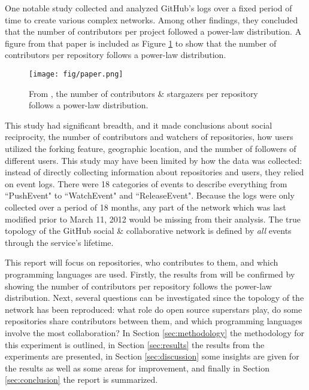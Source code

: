 \documentclass[11pt]{article}
\begin{document}
One notable study \cite{paper} collected and analyzed GitHub's logs over a fixed period of time to create various complex networks. Among other findings, they concluded that the number of contributors per project followed a power-law distribution. A figure from that paper is included as Figure \ref{fig:paper.png} to show that the number of contributors per repository follows a power-law distribution.

\begin{figure}[h]
  \centering
  \texttt{[image: fig/paper.png]}
  \caption{From \cite{paper}, the number of contributors \& stargazers per repository follows a power-law distribution.}
  \label{fig:paper.png}
\end{figure}

This study had significant breadth, and it made conclusions about social reciprocity, the number of contributors and watchers of repositories, how users utilized the forking feature, geographic location, and the number of followers of different users. This study may have been limited by how the data was collected: instead of directly collecting information about repositories and users, they relied on event logs. There were 18 categories of events to describe everything from ``PushEvent" to ``WatchEvent" and ``ReleaseEvent". Because the logs were only collected over a period of 18 months, any part of the network which was last modified prior to March 11, 2012 would be missing from their analysis. The true topology of the GitHub social \& collaborative network is defined by \emph{all} events through the service's lifetime.

This report will focus on repositories, who contributes to them, and which programming languages are used. Firstly, the results from \cite{paper} will be confirmed by showing the number of contributors per repository follows the power-law distribution. Next, several questions can be investigated since the topology of the network has been reproduced: what role do open source superstars play, do some repositories share contributors between them, and which programming languages involve the most collaboration? In Section \ref{sec:methodology} the methodology for this experiment is outlined, in Section \ref{sec:results} the results from the experiments are presented, in Section \ref{sec:discussion} some insights are given for the results as well as some areas for improvement, and finally in Section \ref{sec:conclusion} the report is summarized.
\end{document}
